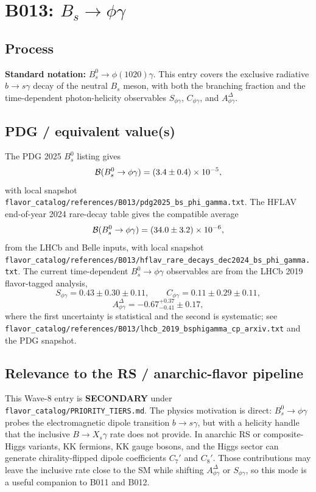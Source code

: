 
\section{B013: \(B_s \to \phi\gamma\)}

\subsection*{Process}
\textbf{Standard notation:} \(B_s^0\to\phi(1020)\gamma\).
This entry covers the exclusive radiative \(b\to s\gamma\) decay of the
neutral \(B_s\) meson, with both the branching fraction and the
time-dependent photon-helicity observables \(S_{\phi\gamma}\),
\(C_{\phi\gamma}\), and \(A^\Delta_{\phi\gamma}\).

\subsection*{PDG / equivalent value(s)}
The PDG 2025 \(B_s^0\) listing gives
\[
  {\cal B}(B_s^0\to\phi\gamma)=(3.4\pm0.4)\times10^{-5},
\]
with local snapshot
\texttt{flavor\_catalog/references/B013/pdg2025\_bs\_phi\_gamma.txt}.
The HFLAV end-of-year 2024 rare-decay table gives the compatible average
\[
  {\cal B}(B_s^0\to\phi\gamma)=(34.0\pm3.2)\times10^{-6},
\]
from the LHCb and Belle inputs, with local snapshot
\texttt{flavor\_catalog/references/B013/hflav\_rare\_decays\_dec2024\_bs\_phi\_gamma.txt}.
The current time-dependent \(B_s^0\to\phi\gamma\) observables are from the
LHCb 2019 flavor-tagged analysis,
\[
  S_{\phi\gamma}=0.43\pm0.30\pm0.11,\qquad
  C_{\phi\gamma}=0.11\pm0.29\pm0.11,
\]
\[
  A^\Delta_{\phi\gamma}=-0.67^{+0.37}_{-0.41}\pm0.17,
\]
where the first uncertainty is statistical and the second is systematic; see
\texttt{flavor\_catalog/references/B013/lhcb\_2019\_bsphigamma\_cp\_arxiv.txt}
and the PDG snapshot.

\subsection*{Relevance to the RS / anarchic-flavor pipeline}
This Wave-8 entry is \textbf{SECONDARY} under
\texttt{flavor\_catalog/PRIORITY\_TIERS.md}.  The physics motivation is direct:
\(B_s^0\to\phi\gamma\) probes the electromagnetic dipole transition
\(b\to s\gamma\), but with a helicity handle that the inclusive
\(B\to X_s\gamma\) rate does not provide.  In anarchic RS or composite-Higgs
variants, KK fermions, KK gauge bosons, and the Higgs sector can generate
chirality-flipped dipole coefficients \(C_7'\) and \(C_8'\).  Those
contributions may leave the inclusive rate close to the SM while shifting
\(A^\Delta_{\phi\gamma}\) or \(S_{\phi\gamma}\), so this mode is a useful
companion to B011 and B012.

